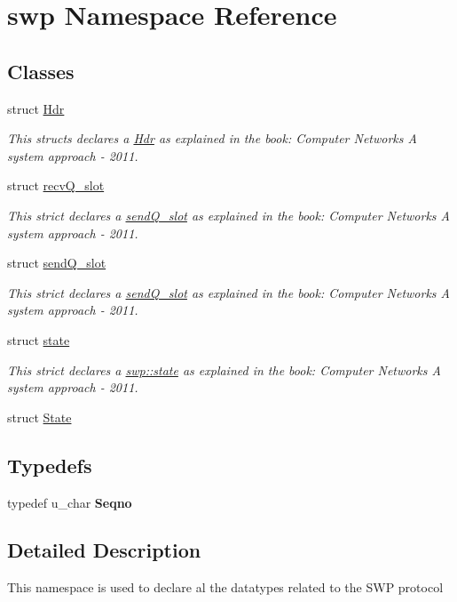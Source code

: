 \hypertarget{namespaceswp}{}\section{swp Namespace Reference}
\label{namespaceswp}
\subsection*{Classes}
\begin{DoxyCompactItemize}
\item 
struct \hyperlink{structswp_1_1Hdr}{Hdr}
\begin{DoxyCompactList}\small\item\em This structs declares a \hyperlink{structswp_1_1Hdr}{Hdr} as explained in the book\+: Computer Networks A system approach -\/ 2011. \end{DoxyCompactList}\item 
struct \hyperlink{structswp_1_1recvQ__slot}{recv\+Q\+\_\+slot}
\begin{DoxyCompactList}\small\item\em This strict declares a \hyperlink{structswp_1_1sendQ__slot}{send\+Q\+\_\+slot} as explained in the book\+: Computer Networks A system approach -\/ 2011. \end{DoxyCompactList}\item 
struct \hyperlink{structswp_1_1sendQ__slot}{send\+Q\+\_\+slot}
\begin{DoxyCompactList}\small\item\em This strict declares a \hyperlink{structswp_1_1sendQ__slot}{send\+Q\+\_\+slot} as explained in the book\+: Computer Networks A system approach -\/ 2011. \end{DoxyCompactList}\item 
struct \hyperlink{structswp_1_1state}{state}
\begin{DoxyCompactList}\small\item\em This strict declares a \hyperlink{structswp_1_1state}{swp\+::state} as explained in the book\+: Computer Networks A system approach -\/ 2011. \end{DoxyCompactList}\item 
struct \hyperlink{structswp_1_1State}{State}
\end{DoxyCompactItemize}
\subsection*{Typedefs}
\begin{DoxyCompactItemize}
\item 
typedef u\+\_\+char {\bfseries Seqno}\hypertarget{namespaceswp_a249c6e8c50c60f9947f596e2e997a76f}{}\label{namespaceswp_a249c6e8c50c60f9947f596e2e997a76f}

\end{DoxyCompactItemize}


\subsection{Detailed Description}
This namespace is used to declare al the datatypes related to the S\+WP protocol 